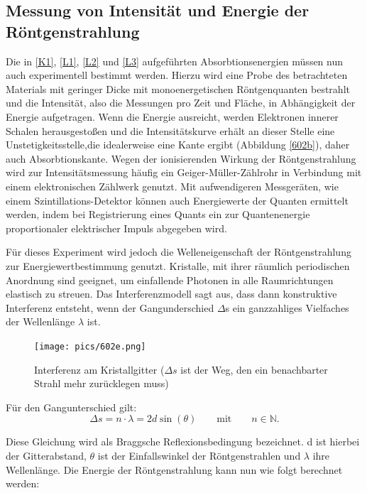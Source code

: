 \subsection{Messung von Intensität und Energie der Röntgenstrahlung}
Die in \eqref{K1},  \eqref{L1},  \eqref{L2}  und \eqref{L3} aufgeführten Absorbtionsenergien müssen nun auch experimentell
bestimmt werden. Hierzu wird eine Probe des betrachteten Materials mit geringer Dicke mit monoenergetischen Röntgenquanten
bestrahlt und die Intensität, also die Messungen pro Zeit und Fläche, in Abhängigkeit der Energie aufgetragen. 
Wenn die Energie ausreicht, werden Elektronen innerer Schalen herausgestoßen und die Intensitätskurve erhält an dieser Stelle 
eine Unstetigkeitsstelle,die idealerweise eine Kante ergibt (Abbildung \eqref{602b}), daher auch Absorbtionskante. Wegen
der ionisierenden Wirkung der Röntgenstrahlung wird zur Intensitätsmessung häufig ein Geiger-Müller-Zählrohr in
Verbindung mit einem elektronischen Zählwerk genutzt. Mit aufwendigeren Messgeräten, wie einem Szintillations-Detektor können
auch Energiewerte der Quanten ermittelt werden, indem bei Registrierung eines Quants ein zur Quantenenergie proportionaler 
elektrischer Impuls abgegeben wird.

Für dieses Experiment wird jedoch die Welleneigenschaft der Röntgenstrahlung zur Energiewertbestimmung genutzt. Kristalle,
mit ihrer räumlich periodischen Anordnung sind geeignet, um einfallende Photonen in alle Raumrichtungen elastisch zu streuen. 
Das Interferenzmodell sagt aus, dass dann konstruktive Interferenz entsteht, wenn der Gangunderschied $\Delta$s ein 
ganzzahliges Vielfaches der Wellenlänge $\lambda$ ist.

\begin{figure}[H]
\texttt{[image: pics/602e.png]}
\centering
\caption{Interferenz am Kristallgitter ($\Delta s$ ist der Weg, den ein benachbarter Strahl mehr zurücklegen muss)}
\label{Gitter}
\end{figure}

Für den Gangunterschied gilt:
\begin{equation}
 \Delta s = n \cdot \lambda = 2d\sin(\theta) \qquad \text{mit} \qquad n \in \mathbb{N}.
\end{equation}

Diese Gleichung wird als Braggsche Reflexionsbedingung bezeichnet. d ist hierbei der Gitterabstand, $\theta$ ist der 
Einfallswinkel der Röntgenstrahlen und $\lambda$ ihre Wellenlänge. Die Energie der Röntgenstrahlung kann nun wie folgt
berechnet werden:

